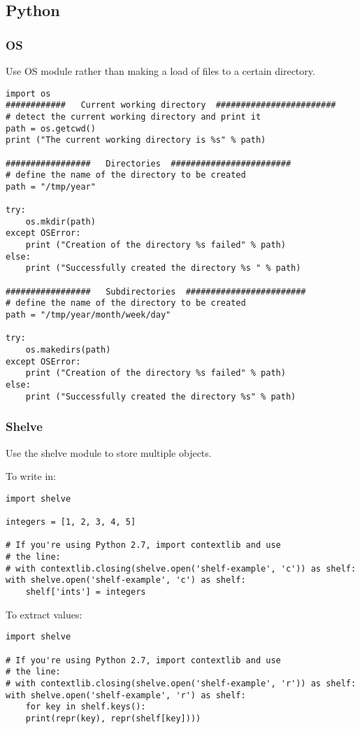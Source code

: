 \documentclass[11pt]{article}
\begin{document}
\subsection{Python}
\label{sec-2-9}
\subsubsection{OS}
\label{sec-2-9-1}
Use OS module rather than making a load of files to a certain directory. 
\begin{verbatim}
import os
############   Current working directory  ########################
# detect the current working directory and print it
path = os.getcwd()  
print ("The current working directory is %s" % path) 

#################   Directories  ########################
# define the name of the directory to be created
path = "/tmp/year"

try:  
    os.mkdir(path)
except OSError:  
    print ("Creation of the directory %s failed" % path)
else:  
    print ("Successfully created the directory %s " % path)

#################   Subdirectories  ########################
# define the name of the directory to be created
path = "/tmp/year/month/week/day"

try:  
    os.makedirs(path)
except OSError:  
    print ("Creation of the directory %s failed" % path)
else:  
    print ("Successfully created the directory %s" % path)
\end{verbatim}
\subsubsection{Shelve}
\label{sec-2-9-2}
Use the shelve module to store multiple objects. 

To write in:
\begin{verbatim}
import shelve

integers = [1, 2, 3, 4, 5]

# If you're using Python 2.7, import contextlib and use
# the line:
# with contextlib.closing(shelve.open('shelf-example', 'c')) as shelf:
with shelve.open('shelf-example', 'c') as shelf:
    shelf['ints'] = integers
\end{verbatim}

To extract values:
\begin{verbatim}
import shelve

# If you're using Python 2.7, import contextlib and use
# the line:
# with contextlib.closing(shelve.open('shelf-example', 'r')) as shelf:
with shelve.open('shelf-example', 'r') as shelf:
    for key in shelf.keys():
	print(repr(key), repr(shelf[key])))
\end{verbatim}
\end{document}
